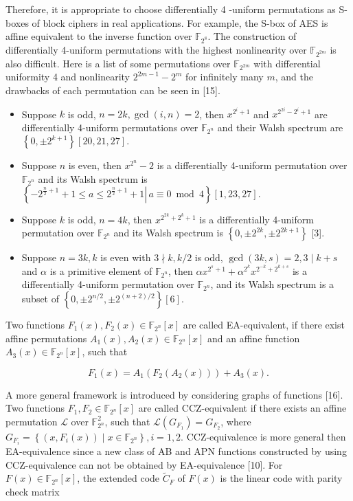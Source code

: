 \documentclass[10pt]{article}
\begin{document}
Therefore, it is appropriate to choose differentially 4 -uniform permutations as S-boxes of block ciphers in real applications. For example, the S-box of AES is affine equivalent to the inverse function over $\mathbb{F}_{2^{8}}$. The construction of differentially 4-uniform permutations with the highest nonlinearity over $\mathbb{F}_{2^{2 m}}$ is also difficult. Here is a list of some permutations over $\mathbb{F}_{2^{2 m}}$ with differential uniformity 4 and nonlinearity $2^{2 m-1}-2^{m}$ for infinitely many $m$, and the drawbacks of each permutation can be seen in [15].

\begin{itemize}
  \item Suppose $k$ is odd, $n=2 k, \operatorname{gcd}(i, n)=2$, then $x^{2^{i}+1}$ and $x^{2^{2 i}-2^{i}+1}$ are differentially 4-uniform permutations over $\mathbb{F}_{2^{n}}$ and their Walsh spectrum are $\left\{0, \pm 2^{k+1}\right\}[20,21,27]$.
  \item Suppose $n$ is even, then $x^{2^{n}}-2$ is a differentially 4-uniform permutation over $\mathbb{F}_{2^{n}}$ and its Walsh spectrum is $\left\{\left.-2^{\frac{n}{2}+1}+1 \leq a \leq 2^{\frac{n}{2}+1}+1 \right\rvert\, a \equiv 0 \bmod 4\right\}[1,23,27]$.
  \item Suppose $k$ is odd, $n=4 k$, then $x^{2^{2 k}+2^{k}+1}$ is a differentially 4-uniform permutation over $\mathbb{F}_{2^{n}}$ and its Walsh spectrum is $\left\{0, \pm 2^{2 k}, \pm 2^{2 k+1}\right\}$ [3].
  \item Suppose $n=3 k, k$ is even with $3 \nmid k, k / 2$ is odd, $\operatorname{gcd}(3 k, s)=2,3 \mid k+s$ and $\alpha$ is a primitive element of $\mathbb{F}_{2^{n}}$, then $\alpha x^{2^{s}+1}+\alpha^{2^{k}} x^{2^{-k}+2^{k+s}}$ is a differentially 4-uniform permutation over $\mathbb{F}_{2^{n}}$, and its Walsh spectrum is a subset of $\left\{0, \pm 2^{n / 2}, \pm 2^{(n+2) / 2}\right\}[6]$.
\end{itemize}

Two functions $F_{1}(x), F_{2}(x) \in \mathbb{F}_{2^{n}}[x]$ are called EA-equivalent, if there exist affine permutations $A_{1}(x), A_{2}(x) \in \mathbb{F}_{2^{n}}[x]$ and an affine function $A_{3}(x) \in \mathbb{F}_{2^{n}}[x]$, such that

$$
F_{1}(x)=A_{1}\left(F_{2}\left(A_{2}(x)\right)\right)+A_{3}(x) .
$$

A more general framework is introduced by considering graphs of functions [16]. Two functions $F_{1}, F_{2} \in \mathbb{F}_{2^{n}}[x]$ are called CCZ-equivalent if there exists an affine permutation $\mathcal{L}$ over $\mathbb{F}_{2^{n}}^{2}$, such that $\mathcal{L}\left(G_{F_{1}}\right)=G_{F_{2}}$, where $G_{F_{i}}=\left\{\left(x, F_{i}(x)\right) \mid x \in \mathbb{F}_{2^{n}}\right\}, i=1,2$. CCZ-equivalence is more general then EA-equivalence since a new class of AB and APN functions constructed by using CCZ-equivalence can not be obtained by EA-equivalence [10]. For $F(x) \in \mathbb{F}_{2^{n}}[x]$, the extended code $\tilde{C}_{F}$ of $F(x)$ is the linear code with parity check matrix
\end{document}

